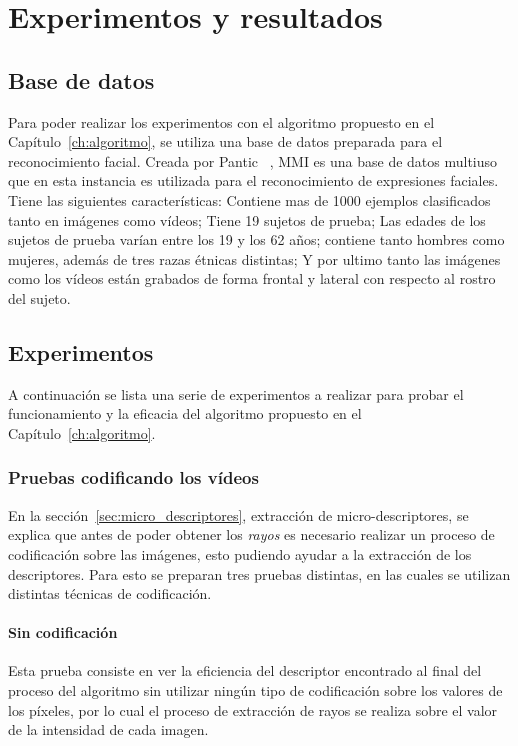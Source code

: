 \chapter[Experimentos y resultados]{Experimentos y resultados}
\label{ch:exp_result}

\section{Base de datos}
\label{exp:bdd}
Para poder realizar los experimentos con el algoritmo propuesto en el Capítulo~\ref{ch:algoritmo}, se utiliza una base de datos preparada para el reconocimiento facial. Creada por Pantic \etal~\cite{Pantic2005}, MMI es una base de datos multiuso que en esta instancia es utilizada para el reconocimiento de expresiones faciales. Tiene las siguientes características: Contiene mas de 1000 ejemplos clasificados tanto en imágenes como vídeos; Tiene 19 sujetos de prueba; Las edades de los sujetos de prueba varían entre los 19 y los 62 años;  contiene tanto hombres como mujeres, además de tres razas étnicas distintas; Y por ultimo tanto las imágenes como los vídeos están grabados de forma frontal y lateral con respecto al rostro del sujeto.


\section{Experimentos}
A continuación se lista una serie de experimentos a realizar para probar el funcionamiento y la eficacia del algoritmo propuesto en el Capítulo~\ref{ch:algoritmo}.

\subsection{Pruebas codificando los vídeos}
\label{exp:cod}
En la sección~\ref{sec:micro_descriptores}, extracción de micro-descriptores, se explica que antes de poder obtener los \textit{rayos} es necesario realizar un proceso de codificación sobre las imágenes, esto pudiendo ayudar a la extracción de los descriptores. Para esto se preparan tres pruebas distintas, en las cuales se utilizan distintas técnicas de codificación.

	\subsubsection{Sin codificación}
	Esta prueba consiste en ver la eficiencia del descriptor encontrado al final del proceso del algoritmo sin utilizar ningún tipo de codificación sobre los valores de los píxeles, por lo cual el proceso de extracción de rayos se realiza sobre el valor de la intensidad de cada imagen.

